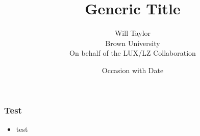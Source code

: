 \documentclass{beamer}
\title{Generic Title}
\date{Occasion with Date}
\author{Will Taylor \\
        Brown University \\
        On behalf of the LUX/LZ Collaboration}
\begin{document}
\begin{frame}
\titlepage
\end{frame}

\begin{frame}
    \frametitle{Test}
    \begin{itemize}
        \item{test}
    \end{itemize}
\end{frame}
\end{document}
